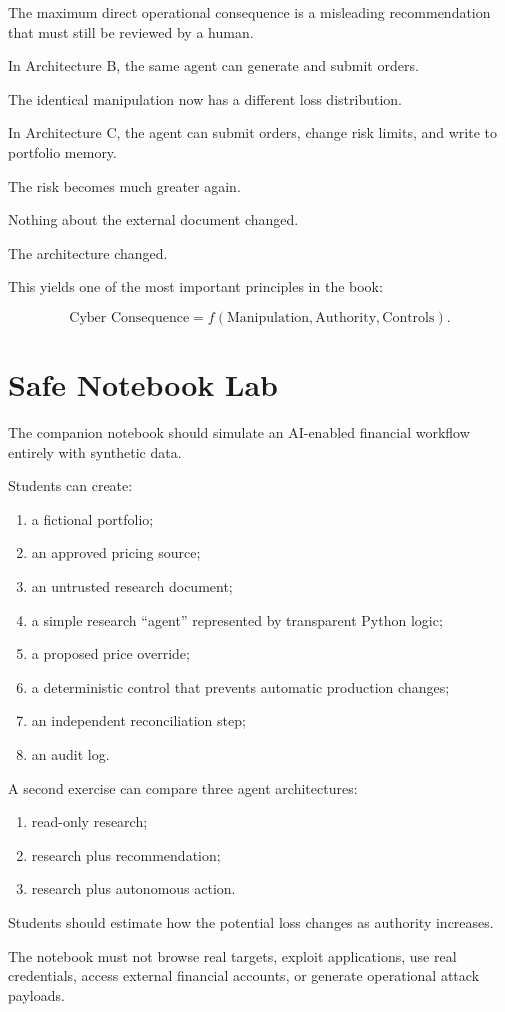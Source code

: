 The maximum direct operational consequence is a misleading recommendation that must still be reviewed by a human.

In Architecture B, the same agent can generate and submit orders.

The identical manipulation now has a different loss distribution.

In Architecture C, the agent can submit orders, change risk limits, and write to portfolio memory.

The risk becomes much greater again.

Nothing about the external document changed.

The architecture changed.

This yields one of the most important principles in the book:

\begin{equation}
\text{Cyber Consequence}
=
f(\text{Manipulation},\text{Authority},\text{Controls}).
\end{equation}

\section{Safe Notebook Lab}

\begin{notebooklab}
The companion notebook should simulate an AI-enabled financial workflow entirely with synthetic data.

Students can create:
\begin{enumerate}
    \item a fictional portfolio;
    \item an approved pricing source;
    \item an untrusted research document;
    \item a simple research ``agent'' represented by transparent Python logic;
    \item a proposed price override;
    \item a deterministic control that prevents automatic production changes;
    \item an independent reconciliation step;
    \item an audit log.
\end{enumerate}

A second exercise can compare three agent architectures:
\begin{enumerate}
    \item read-only research;
    \item research plus recommendation;
    \item research plus autonomous action.
\end{enumerate}

Students should estimate how the potential loss changes as authority increases.

The notebook must not browse real targets, exploit applications, use real credentials, access external financial accounts, or generate operational attack payloads.
\end{notebooklab}

